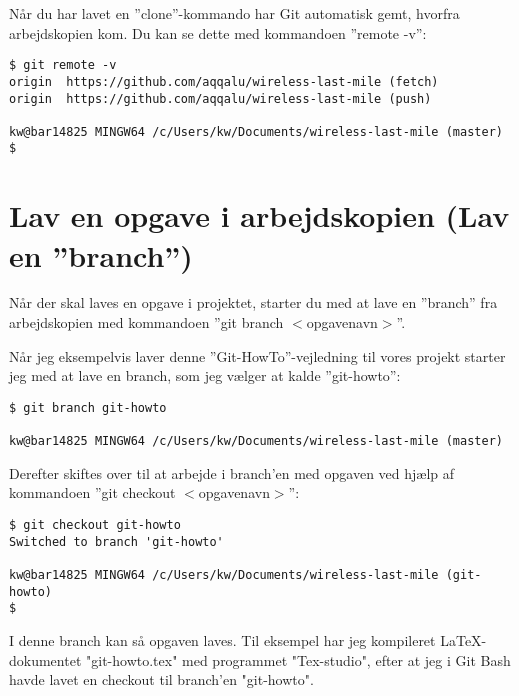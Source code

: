 \documentclass[11pt,a4paper,twoside]{report}
\begin{document}
\par
Når  du har lavet en ''clone''-kommando har Git automatisk gemt, hvorfra arbejdskopien kom. Du kan se dette med kommandoen ''remote -v'':
\begin{verbatim}
$ git remote -v
origin  https://github.com/aqqalu/wireless-last-mile (fetch)
origin  https://github.com/aqqalu/wireless-last-mile (push)

kw@bar14825 MINGW64 /c/Users/kw/Documents/wireless-last-mile (master)
$ 
\end{verbatim}

\section{Lav en opgave i arbejdskopien (Lav en ''branch'')}
Når der skal laves en opgave i projektet, starter du med at lave en ''branch'' fra arbejdskopien med kommandoen ''git branch $<$opgavenavn$>$''.
\par
Når jeg eksempelvis laver denne ''Git-HowTo''-vejledning til vores projekt starter jeg med at lave en branch, som jeg vælger at kalde ''git-howto'':
\begin{verbatim}
$ git branch git-howto

kw@bar14825 MINGW64 /c/Users/kw/Documents/wireless-last-mile (master)
\end{verbatim}

Derefter skiftes over til at arbejde i branch'en med opgaven ved hjælp af kommandoen ''git checkout $<$opgavenavn$>$'':
\begin{verbatim}
$ git checkout git-howto
Switched to branch 'git-howto'

kw@bar14825 MINGW64 /c/Users/kw/Documents/wireless-last-mile (git-howto)
$
\end{verbatim}
I denne branch kan så opgaven laves. Til eksempel har jeg kompileret \LaTeX-dokumentet "git-howto.tex" med programmet "Tex-studio", efter at jeg i Git Bash havde lavet en checkout til branch'en "git-howto".
\end{document}

